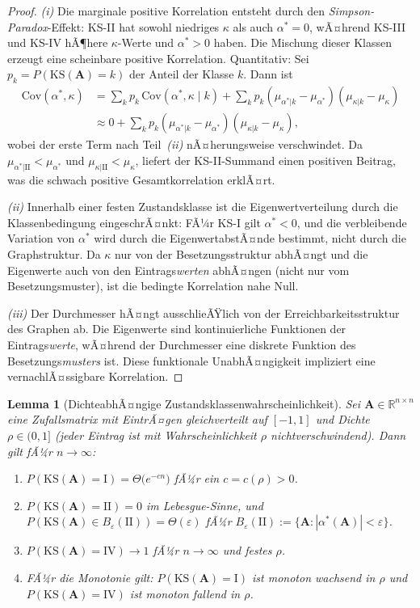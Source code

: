 ﻿\documentclass[12pt, a4paper, titlepage]{report}
\newtheorem{lemma}[theorem]{Lemma}
\theoremstyle{definition}
\theoremstyle{remark}
\newcommand{\R}{\mathbb{R}}
\newcommand{\vA}{\bm{A}}
\newcommand{\KS}{\mathrm{KS}}
\begin{document}
\begin{proof}
\textit{(i)} Die marginale positive Korrelation entsteht durch den
\emph{Simpson-Paradox}-Effekt: KS-II hat sowohl niedriges $\kappa$ als auch
$\alpha^* = 0$, wÃ¤hrend KS-III und KS-IV hÃ¶here $\kappa$-Werte und $\alpha^* > 0$
haben. Die Mischung dieser Klassen erzeugt eine scheinbare positive Korrelation.
Quantitativ: Sei $p_k = P(\KS(\vA) = k)$ der Anteil der Klasse $k$. Dann ist
\begin{align*}
  \mathrm{Cov}(\alpha^*, \kappa)
  &= \sum_k p_k \,\mathrm{Cov}(\alpha^*, \kappa \mid k)
    + \sum_k p_k (\mu_{\alpha^*|k} - \mu_{\alpha^*})(\mu_{\kappa|k} - \mu_\kappa) \\
  &\approx 0 + \sum_k p_k (\mu_{\alpha^*|k} - \mu_{\alpha^*})(\mu_{\kappa|k} - \mu_\kappa),
\end{align*}
wobei der erste Term nach Teil~\textit{(ii)} nÃ¤herungsweise verschwindet.
Da $\mu_{\alpha^*|\mathrm{II}} < \mu_{\alpha^*}$ und $\mu_{\kappa|\mathrm{II}} <
\mu_\kappa$, liefert der KS-II-Summand einen positiven Beitrag, was die
schwach positive Gesamtkorrelation erklÃ¤rt.

\textit{(ii)} Innerhalb einer festen Zustandsklasse ist die Eigenwertverteilung
durch die Klassenbedingung eingeschrÃ¤nkt: FÃ¼r KS-I gilt $\alpha^* < 0$, und die
verbleibende Variation von $\alpha^*$ wird durch die EigenwertabstÃ¤nde bestimmt,
nicht durch die Graphstruktur. Da $\kappa$ nur von der Besetzungsstruktur abhÃ¤ngt
und die Eigenwerte auch von den Eintrags\emph{werten} abhÃ¤ngen (nicht nur vom
Besetzungsmuster), ist die bedingte Korrelation nahe Null.

\textit{(iii)} Der Durchmesser hÃ¤ngt ausschlieÃŸlich von der Erreichbarkeitsstruktur
des Graphen ab. Die Eigenwerte sind kontinuierliche Funktionen der Eintrags\emph{werte},
wÃ¤hrend der Durchmesser eine diskrete Funktion des Besetzungs\emph{musters} ist. Diese
funktionale UnabhÃ¤ngigkeit impliziert eine vernachlÃ¤ssigbare Korrelation.
\end{proof}

\begin{lemma}[DichteabhÃ¤ngige Zustandsklassenwahrscheinlichkeit]
\label{lem:dichte_ks}
Sei $\vA \in \R^{n \times n}$ eine Zufallsmatrix mit EintrÃ¤gen gleichverteilt auf
$[-1,1]$ und Dichte $\rho \in (0,1]$ (jeder Eintrag ist mit Wahrscheinlichkeit $\rho$
nichtverschwindend). Dann gilt fÃ¼r $n \to \infty$:
\begin{enumerate}[label=(\roman*)]
  \item $P(\KS(\vA) = \mathrm{I}) = \Theta\bigl(e^{-cn}\bigr)$ fÃ¼r ein $c = c(\rho) > 0$.
  \item $P(\KS(\vA) = \mathrm{II}) = 0$ im Lebesgue-Sinne, und
    $P(\KS(\vA) \in B_\varepsilon(\mathrm{II})) = \Theta(\varepsilon)$ fÃ¼r
    $B_\varepsilon(\mathrm{II}) := \{\vA : |\alpha^*(\vA)| < \varepsilon\}$.
  \item $P(\KS(\vA) = \mathrm{IV}) \to 1$ fÃ¼r $n \to \infty$ und festes $\rho$.
  \item FÃ¼r die Monotonie gilt: $P(\KS(\vA) = \mathrm{I})$ ist monoton wachsend in
    $\rho$ und $P(\KS(\vA) = \mathrm{IV})$ ist monoton fallend in $\rho$.
\end{enumerate}
\end{lemma}
\end{document}
